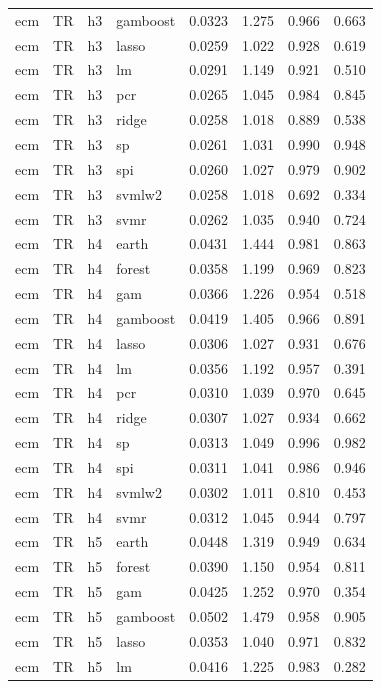 \begin{ThreePartTable}
\begin{longtable}[t]{llclcccc}
ecm & TR & h3 & gamboost & 0.0323 & 1.275 & 0.966 & 0.663\\
ecm & TR & h3 & lasso & 0.0259 & 1.022 & 0.928 & 0.619\\
ecm & TR & h3 & lm & 0.0291 & 1.149 & 0.921 & 0.510\\
ecm & TR & h3 & pcr & 0.0265 & 1.045 & 0.984 & 0.845\\
ecm & TR & h3 & ridge & 0.0258 & 1.018 & 0.889 & 0.538\\
ecm & TR & h3 & sp & 0.0261 & 1.031 & 0.990 & 0.948\\
ecm & TR & h3 & spi & 0.0260 & 1.027 & 0.979 & 0.902\\
ecm & TR & h3 & svmlw2 & 0.0258 & 1.018 & 0.692 & 0.334\\
ecm & TR & h3 & svmr & 0.0262 & 1.035 & 0.940 & 0.724\\
\addlinespace
ecm & TR & h4 & earth & 0.0431 & 1.444 & 0.981 & 0.863\\
ecm & TR & h4 & forest & 0.0358 & 1.199 & 0.969 & 0.823\\
ecm & TR & h4 & gam & 0.0366 & 1.226 & 0.954 & 0.518\\
ecm & TR & h4 & gamboost & 0.0419 & 1.405 & 0.966 & 0.891\\
ecm & TR & h4 & lasso & 0.0306 & 1.027 & 0.931 & 0.676\\
ecm & TR & h4 & lm & 0.0356 & 1.192 & 0.957 & 0.391\\
ecm & TR & h4 & pcr & 0.0310 & 1.039 & 0.970 & 0.645\\
ecm & TR & h4 & ridge & 0.0307 & 1.027 & 0.934 & 0.662\\
ecm & TR & h4 & sp & 0.0313 & 1.049 & 0.996 & 0.982\\
ecm & TR & h4 & spi & 0.0311 & 1.041 & 0.986 & 0.946\\
ecm & TR & h4 & svmlw2 & 0.0302 & 1.011 & 0.810 & 0.453\\
ecm & TR & h4 & svmr & 0.0312 & 1.045 & 0.944 & 0.797\\
\addlinespace
ecm & TR & h5 & earth & 0.0448 & 1.319 & 0.949 & 0.634\\
ecm & TR & h5 & forest & 0.0390 & 1.150 & 0.954 & 0.811\\
ecm & TR & h5 & gam & 0.0425 & 1.252 & 0.970 & 0.354\\
ecm & TR & h5 & gamboost & 0.0502 & 1.479 & 0.958 & 0.905\\
ecm & TR & h5 & lasso & 0.0353 & 1.040 & 0.971 & 0.832\\
ecm & TR & h5 & lm & 0.0416 & 1.225 & 0.983 & 0.282\\

\end{longtable}
\end{ThreePartTable}

